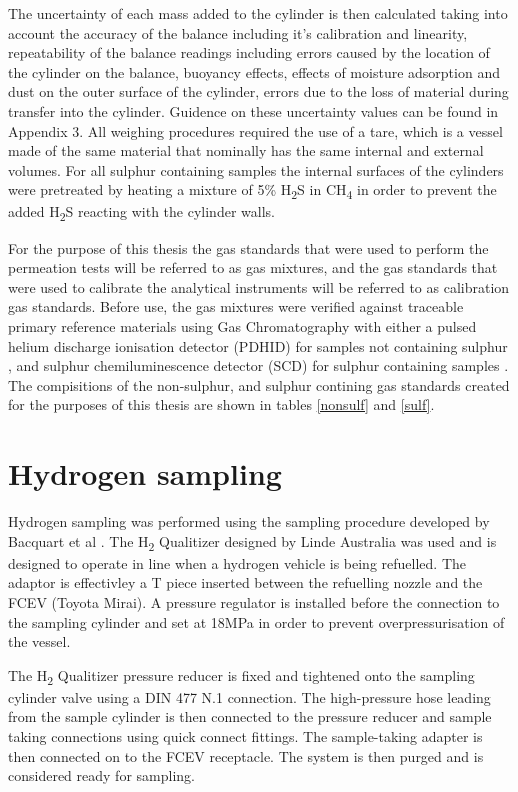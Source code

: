 The uncertainty of each mass added to  the cylinder is then calculated taking into account the accuracy of the balance including it's calibration and linearity, repeatability of the balance readings including errors caused by the location of the cylinder on the balance, buoyancy effects, effects of moisture adsorption and dust on the outer surface of the cylinder, errors due to the loss of material during transfer into the cylinder. Guidence on these uncertainty values can be found in Appendix 3. All weighing procedures required the use of a tare, which is a vessel made of the same material that nominally has the same internal and external volumes. For all sulphur containing samples the internal surfaces of the cylinders were pretreated by heating a mixture of 5\% H\textsubscript{2}S in CH\textsubscript{4} in order to prevent the added H\textsubscript{2}S reacting with the cylinder walls. 

For the purpose of this thesis the gas standards that were used to perform the permeation tests will be referred to as gas mixtures, and the gas standards that were used to calibrate the analytical instruments will be referred to as calibration gas standards. Before use, the gas mixtures were verified against traceable primary reference materials using Gas Chromatography with either a pulsed helium discharge ionisation detector (PDHID) for samples not containing sulphur \cite{bacquart_murugan_2019, morris_bacquart_2019}, and sulphur chemiluminescence detector (SCD) for sulphur containing samples \cite{bacquart_murugan_20191}. The compisitions of the non-sulphur, and sulphur contining gas standards created for the purposes of this thesis are shown in tables \ref{nonsulf} and \ref{sulf}.

\section{Hydrogen sampling}\label{sampletake}
Hydrogen sampling was performed using the sampling procedure developed by Bacquart et al \cite{BACQUART20205565}. The H\textsubscript{2} Qualitizer designed by Linde Australia was used and is designed to operate in line when a hydrogen vehicle is being refuelled. The adaptor is effectivley a T piece inserted between the refuelling nozzle and the FCEV (Toyota Mirai). A pressure regulator is installed before the connection to the sampling cylinder and set at 18MPa in order to prevent overpressurisation of the vessel. 

The H\textsubscript{2} Qualitizer pressure reducer is fixed and tightened onto the sampling cylinder valve using a DIN 477 N.1 connection. The high-pressure hose leading from the sample cylinder is then connected to the pressure reducer and sample taking connections using quick connect fittings.  The sample-taking adapter is then connected on to the FCEV receptacle. The system is then purged and is considered ready for sampling. 
 
